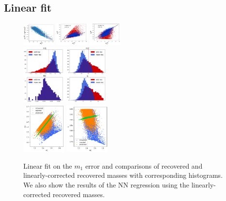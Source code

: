 \documentclass[prd,aps,twocolumn,a4paper,showkeys,nofootinbib]{revtex4-1}
\begin{document}
\subsection{Linear fit}
\begin{figure}[]
  \center
  \includegraphics[width=0.15\textwidth]{./Figs/linear_fit.png}
  \includegraphics[width=0.15\textwidth]{./Figs/linear_checkm1.png}
  \includegraphics[width=0.15\textwidth]{./Figs/linear_checkm2.png} \\
  \includegraphics[width=0.4\textwidth]{./Figs/linear_histo.png} \\
  \includegraphics[width=0.2\textwidth]{./Figs/linear_thenNN_m2.png}
  \includegraphics[width=0.2\textwidth]{./Figs/linear_thenNN_q.png}
  \caption{\label{fig:linear} 
  Linear fit on the $m_1$ error and comparisons of recovered and linearly-corrected
  recovered masses with corresponding histograms. We also show the results
  of the NN regression using the linearly-corrected recovered masses.}
\end{figure}
\end{document}
